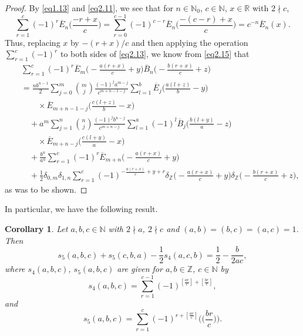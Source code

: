 \documentclass[reqno]{amsart}
\numberwithin{equation}{section}
\newtheorem{corollary}[thm]{Corollary}
\begin{document}
\begin{proof}
By \eqref{eq1.13} and \eqref{eq2.11}, we see that for $n\in\mathbb{N}_{0}$, $c\in\mathbb{N}$, $x\in\mathbb{R}$ with $2\nmid c$,
\begin{equation}\label{eq2.15}
\sum_{r=1}^{c}(-1)^{r}\overline{E}_{n}\biggl(\frac{-r+x}{c}\biggl)=\sum_{r=0}^{c-1}(-1)^{c-r}\overline{E}_{n}\biggl(\frac{-(c-r)+x}{c}\biggl)=c^{-n}\overline{E}_{n}(x).
\end{equation}
Thus, replacing $x$ by $-(r+x)/c$ and then applying the operation $\sum_{r=1}^{c}(-1)^{r}$ to both sides of \eqref{eq2.13}, we know from \eqref{eq2.15} that
\begin{eqnarray*}
&&\sum_{r=1}^{c}(-1)^{r}\overline{E}_{m}\biggl(-\frac{a(r+x)}{c}+y\biggl)\overline{B}_{n}\biggl(-\frac{b(r+x)}{c}+z\biggl)\nonumber\\
&&=\frac{nb^{n-1}}{2}\sum_{j=0}^{m}
\binom{m}{j}\frac{(-1)^{j}a^{m-j}}{c^{m+n-1-j}}\sum_{l=1}^{b}\overline{E}_{j}\biggl(\frac{a(l+z)}{b}-y\biggl)\nonumber\\
&&\qquad\times\overline{E}_{m+n-1-j}\biggl(\frac{c(l+z)}{b}-x\biggl)\nonumber\\
&&\quad+a^{m}\sum_{j=1}^{n}\binom{n}{j}\frac{(-1)^{j}b^{n-j}}{c^{m+n-j}}\sum_{l=1}^{a}(-1)^{l}
\overline{B}_{j}\biggl(\frac{b(l+y)}{a}-z\biggl)\nonumber\\
&&\qquad\times\overline{E}_{m+n-j}\biggl(\frac{c(l+y)}{a}-x\biggl)\nonumber\\
&&\quad+\frac{b^{n}}{a^{n}}\sum_{r=1}^{c}(-1)^{r}\overline{E}_{m+n}\biggl(-\frac{a(r+x)}{c}+y\biggl)\nonumber\\
&&\quad+\frac{1}{2}\delta_{0,m}\delta_{1,n}\sum_{r=1}^{c}(-1)^{-\frac{a(r+x)}{c}+y+r}\delta_{\mathbb{Z}}\biggl(-\frac{a(r+x)}{c}+y\biggl)
\delta_{\mathbb{Z}}\biggl(-\frac{b(r+x)}{c}+z\biggl),
\end{eqnarray*}
as was to be shown.
\end{proof}

In particular, we have the following result.

\begin{corollary}\label{cor2.7} Let $a,b,c\in\mathbb{N}$ with $2\nmid a$, $2\nmid c$ and $(a,b)=(b,c)=(a,c)=1$. Then
\begin{equation}\label{eq2.16}
s_{5}(a,b,c)+s_{5}(c,b,a)-\frac{1}{2}s_{4}(a,c,b)=\frac{1}{2}-\frac{b}{2ac},
\end{equation}
where $s_{4}(a,b,c)$, $s_{5}(a,b,c)$ are given for $a,b\in\mathbb{Z}$, $c\in\mathbb{N}$ by
\begin{equation*}
s_{4}(a,b,c)=\sum_{r=1}^{c-1}(-1)^{[\frac{ar}{c}]+[\frac{br}{c}]},
\end{equation*}
and
\begin{equation*}
s_{5}(a,b,c)=\sum_{r=1}^{c}(-1)^{r+[\frac{ar}{c}]}\biggl(\biggl(\frac{br}{c}\biggl)\biggl).
\end{equation*}
\end{corollary}
\end{document}
